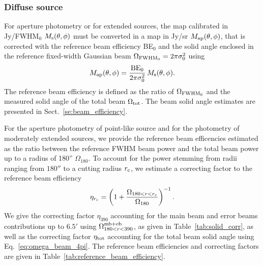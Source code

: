 \subsubsection{Diffuse source}
\label{se:extended_source_calib}

{\lp For aperture photometry or for extended sources, the map calibrated in
Jy/FWHM$_{0}$ $M_{\rm{s}}(\theta, \phi)$ must be converted in a
map in Jy/sr $M_{\rm{ap}}(\theta, \phi)$, that is corrected
with the reference beam efficiency BE$_{0}$ and the solid
angle enclosed in the reference fixed-width Gaussian beam
$\Omega_{\rm{FWHM}_{0}} = 2\pi \sigma_0^2$ using
\begin{equation}
M_{\rm{ap}}(\theta, \phi) = \frac{\rm{BE}_{0}}{2\pi \sigma_0^2} \, M_{\rm{s}}(\theta, \phi).
\end{equation}}
The reference beam efficiency is defined as the ratio of 
$\Omega_{\rm{FWHM}_{0}}$ and the measured solid angle of the total
beam $\Omega_{\rm{tot}}$.
The beam solid angle estimates are presented in
Sect.~\ref{se:beam_efficiency}.

{\lp For the aperture photometry of point-like source and for the
photometry of moderately extended sources, we provide the reference
beam efficencies estimated as the ratio between the
reference FWHM beam power and the total beam power up to a radius of
180'' $\Omega_{180}$. To account for the power stemming from radii
ranging from $180''$ to a cutting radius $r_{\rm{c}}$, we estimate a
correcting factor to the reference beam efficiency 
\begin{equation}
\eta_{r_{\rm{c}}} = \left( 1 + \frac{\Omega_{180<r<r_{\rm{c}}}}{\Omega_{180}} \right)^{-1}.
\end{equation}
We give the correcting factor $\eta_{390}$ accounting for the main
beam and error beams contributions up to $6.5'$
using $\Omega_{180<r<390}^{\rm{mb+eb}}$, as given in
Table~\ref{tab:solid_corr}, as well as the correcting factor
$\eta_{\rm{tot}}$ accounting for the total beam
solid angle using Eq.~\ref{eq:omega_beam_4pi}. The reference beam efficiencies
 and correcting factors are given in Table~\ref{tab:reference_beam_efficiency}.
}

